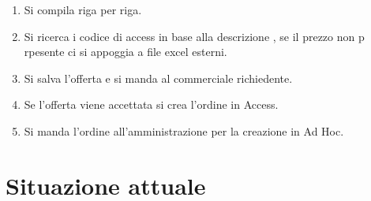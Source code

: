 \documentclass[12pt, a4paper]{article} %
\begin{document}
\begin{enumerate}
\begin{itemize}
                        un silo per lo zuchero ha caratteristiche e prezzi diversi rispetto a un silo
                        per la farina. Qui dei template possono aiutare l'utente.
                  \item Note sulla funzionalalita possono aiutare l'utente meno asperto ad orientarsi.
                  Al momento esiste la schemarta "Prodotti".
                  \item Nell'iserimento bisogna stare attenti a non proporre compoennti non più di utilizzo ,
                  al momento non è presente un sistema che avverta di ciò a meno della presenza di "EX-" prima della descrizione.
                  \item Inserimento condizioni di montaggio, pagamento e consegna.
                  \item Inserimento dei costi e tempi di montaggio in base all'impianto ed il luogo di installazione.
            \end{itemize}
      \item Si compila riga per riga.
      \item Si ricerca i codice di access in base alla descrizione , se il prezzo non p
            rpesente ci si appoggia a file excel esterni.
      \item Si salva l'offerta e si manda al commerciale richiedente.
      \item Se l'offerta viene accettata si crea l'ordine in Access.
      \item Si manda l'ordine all'amministrazione per la creazione in Ad Hoc.
\end{enumerate}

\section{Situazione attuale}
\end{document}
